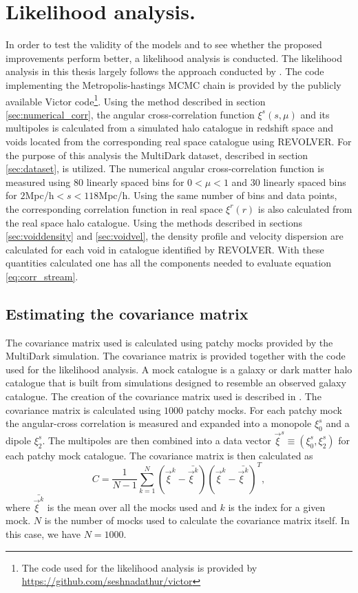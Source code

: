 \section{Likelihood analysis.}\label{sec:maximum_likelihood_method}
In order to test the validity of the models and to see whether the proposed improvements perform better, a likelihood analysis is conducted. The likelihood analysis in this thesis largely follows the approach conducted by \cite{BeyondBAO}. The code implementing the Metropolis-hastings MCMC chain is provided by the publicly available Victor code\footnote{The code used for the likelihood analysis is provided by \url{https://github.com/seshnadathur/victor}}. Using the method described in section \ref{sec:numerical_corr}, the angular cross-correlation function $\xi^s(s,\mu)$ and its multipoles is calculated from a simulated halo catalogue in redshift space and voids located from the corresponding real space catalogue using REVOLVER. For the purpose of this analysis the MultiDark dataset, described in section \ref{sec:dataset}, is utilized. The numerical angular cross-correlation function is measured using $80$ linearly spaced bins for $0<\mu<1$ and $30$ linearly spaced bins for $2$Mpc/h$<s<118$Mpc/h. Using the same number of bins and data points, the corresponding correlation function in real space $\xi^r(r)$ is also calculated from the real space halo catalogue. Using the methods described in sections \ref{sec:voiddensity} and \ref{sec:voidvel}, the density profile and velocity dispersion are calculated for each void in catalogue identified by REVOLVER. With these quantities calculated one has all the components needed to evaluate equation \ref{eq:corr_stream}.
\subsection{Estimating the covariance matrix}
The covariance matrix used is calculated using patchy mocks provided by the MultiDark simulation\cite{MDmock1}\cite{MDmock2}. The covariance matrix is provided together with the code used for the likelihood analysis. A mock catalogue is a galaxy or dark matter halo catalogue that is built from simulations designed to resemble an observed galaxy catalogue. The creation of the covariance matrix used is described in \cite{BeyondBAO}. The covariance matrix is calculated using $1000$ patchy mocks. For each patchy mock the angular-cross correlation is measured and expanded into a monopole $\xi_0^s$ and a dipole $\xi_2^s$. The multipoles are then combined into a data vector $\vec{\xi}^s\equiv(\xi_0^s, \xi_2^s)$ for each patchy mock catalogue. The covariance matrix is then calculated as
\begin{equation}
    C=\frac{1}{N-1}\sum_{k=1}^N(\vec{\xi} ^k-\bar{\vec{\xi}^k})(\vec{\xi}^k-\bar{\vec{\xi}^k})^T,
\end{equation} 
where $\bar{\vec{\xi}^k}$ is the mean over all the mocks used and $k$ is the index for a given mock. $N$ is the number of mocks used to calculate the covariance matrix itself. In this case, we have $N=1000$.

